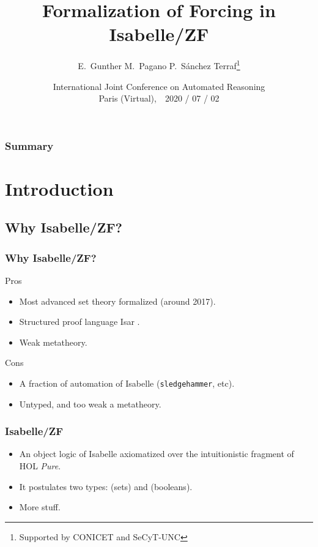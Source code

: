 \documentclass[english]{beamer}
\title[Forcing in Isabelle/ZF]{Formalization of Forcing in Isabelle/ZF}
\author[E.~Gunther, M.~Pagano, PST]{E.~Gunther \qquad M.~Pagano \qquad P.~Sánchez Terraf\thanks{Supported by
    CONICET and SeCyT-UNC} 
}
\institute[UNC]{CIEM-FaMAF --- Universidad Nacional de Córdoba}
\date[IJCAR 2020]{International Joint Conference on Automated
  Reasoning\\ Paris (Virtual),\ \  2020 / 07 / 02}
\begin{document}

\begin{frame}[plain]
  \titlepage
  \begin{center}
    \insertlogo
  \end{center}
\end{frame}
%
\begin{frame}
  \frametitle{Summary}
  \tableofcontents
  \transwipe
\end{frame}
%
\section{Introduction}

\subsection{Why Isabelle/ZF?}

\begin{frame}
  \frametitle{Why Isabelle/ZF?}
  \begin{block}{Pros}
    \begin{itemize}
    \item Most advanced set theory formalized (around 2017).
    \item Structured proof language Isar
      \citep{DBLP:conf/tphol/Wenzel99}.
    \item Weak metatheory.
    \end{itemize}
  \end{block}
  \pause
  \begin{block}{Cons}
    \begin{itemize}
    \item A fraction of automation of Isabelle (\texttt{sledgehammer},
      etc).
    \item Untyped, and too weak a metatheory.
    \end{itemize}
  \end{block}
\end{frame}

\begin{frame}
  \frametitle{Isabelle/ZF \citep{DBLP:journals/jar/PaulsonG96}}
  \begin{itemize}
  \item<+-> An object logic of Isabelle axiomatized over the
    intuitionistic fragment of HOL \emph{Pure}. 
  \item<+-> It postulates \alert<3->{two types}: 
    (sets) and  (booleans). 
    \pause
  \item<+-> More stuff.
  \end{itemize}
\end{frame}
\end{document}
